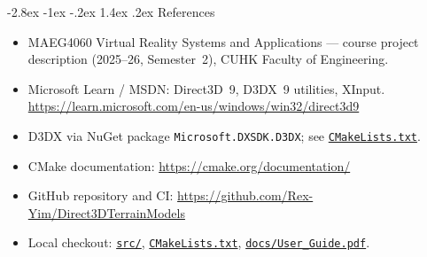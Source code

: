 \documentclass[11pt,a4paper]{article}
\makeatletter
\newcommand{\gh}[2]{\href{https://github.com/Rex-Yim/Direct3DTerrainModels/blob/main/#1}{\texttt{#2}}}
\renewcommand\section{\@startsection{section}{1}{\z@}%
  {-2.8ex \@plus -1ex \@minus -.2ex}%
  {1.4ex \@plus .2ex}%
  {\reset@font\Large\bfseries\color{Brand}}}
\newcommand{\sectionrule}{%
  \par\vspace{-0.35em}\noindent{\color{RuleGray}\rule{\linewidth}{0.55pt}}\par\vspace{0.6em}}
\makeatother
\begin{document}
\section{References}\sectionrule
\begingroup\sloppy\small
\begin{itemize}
  \item MAEG4060 Virtual Reality Systems and Applications --- course project description (2025--26, Semester~2), CUHK Faculty of Engineering.
  \item Microsoft Learn / MSDN: Direct3D~9, D3DX~9 utilities, XInput.\newline
        \url{https://learn.microsoft.com/en-us/windows/win32/direct3d9}
  \item D3DX via NuGet package \texttt{Microsoft.DXSDK.D3DX}; see \gh{CMakeLists.txt}{CMakeLists.txt}.
  \item CMake documentation: \url{https://cmake.org/documentation/}
  \item GitHub repository and CI:\newline
        \url{https://github.com/Rex-Yim/Direct3DTerrainModels}
  \item Local checkout: \gh{src/}{src/}, \gh{CMakeLists.txt}{CMakeLists.txt}, \gh{docs/User\_Guide.pdf}{docs/User\_Guide.pdf}.
\end{itemize}
\endgroup
\end{document}
